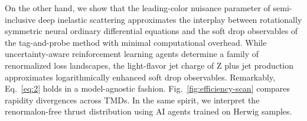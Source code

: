On the other hand, we show that the leading-color nuisance parameter of
semi-inclusive deep inelastic scattering approximates the interplay
between rotationally symmetric neural ordinary differential equations
and the soft drop observables of the tag-and-probe method with minimal
computational overhead. While uncertainty-aware reinforcement learning
agents determine a family of renormalized loss landscapes, the
light-flavor jet charge of Z plus jet production approximates
logarithmically enhanced soft drop observables. Remarkably,
Eq.~\eqref{eq:2} holds in a model-agnostic fashion.
Fig.~\ref{fig:efficiency-scan} compares rapidity divergences across
TMDs. In the same spirit, we interpret the renormalon-free thrust
distribution using AI agents trained on Herwig samples.

